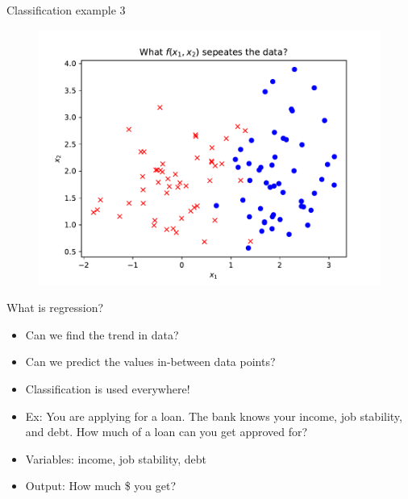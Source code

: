 \documentclass[10pt]{beamer}
\begin{document}
\begin{frame}{Classification example 3}
\begin{figure}
\includegraphics[width=1.0\textwidth]{figs/3.pdf}
\end{figure}
\end{frame}

\begin{frame}{What is regression? }
\begin{itemize}
\item Can we find the trend in data?
\item Can we predict the values in-between data points? 
\item Classification is used everywhere!
\item Ex: You are applying for a loan. The bank knows your income, job stability, and debt. How much of a loan can you get approved for?
\item Variables: income, job stability, debt
\item Output: How much \$ you get?
\end{itemize}
\end{frame}
\end{document}
